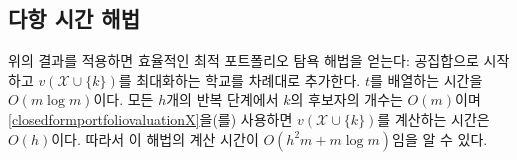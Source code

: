 \documentclass[11pt]{article} %
\DeclareMathOperator*{\argmax}{arg\,max}
\newif\ifen
\newtheorem{theorem}{Theorem}
\theoremstyle{definition}
\newtheorem{theorem}{정리}
\theoremstyle{definition}
\begin{document}
\ifen \subsection{Polynomial-time solution} \else \subsection{다항 시간 해법}\fi
\ifen Applying the result above yields an efficient greedy algorithm for the optimal portfolio: Start with the empty set and add schools one at a time, maximizing $v(\mathcal{X}\cup \{k\})$ at each addition. Sorting $t$ is  $O(m \log m)$.  At each of the $h$ iterations, there are $O(m)$ candidates for $k$, and computing $v(\mathcal{X}\cup \{k\})$ is $O(h)$ using \eqref{closedformportfoliovaluationX}; therefore, the time complexity of this algorithm is $O(h^2 m + m \log m)$. 
\else 위의 결과를 적용하면 효율적인 최적 포트폴리오 탐욕 해법을 얻는다: 공집합으로 시작하고 $v(\mathcal{X}\cup \{k\})$를 최대화하는 학교를 차례대로 추가한다. $t$를 배열하는 시간을 $O(m \log m)$이다. 모든 $h$개의 반복 단계에서 $k$의 후보자의 개수는 $O(m)$이며 \eqref{closedformportfoliovaluationX}을(를) 사용하면 $v(\mathcal{X}\cup \{k\})$를 계산하는 시간은 $O(h)$이다. 따라서 이 해법의 계산 시간이 $O(h^2 m + m \log m)$임을 알 수 있다.\fi
%
\end{document}
